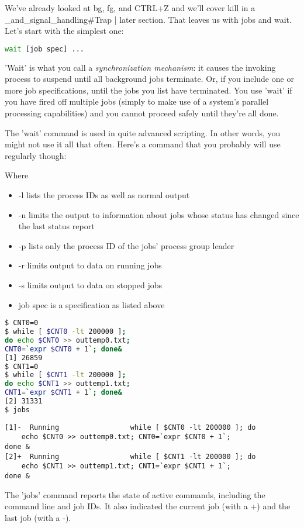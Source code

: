 We've already looked at bg, fg, and CTRL+Z and we'll cover kill in a
\_and\_signal\_handling\#Trap | later section. That leaves us with jobs and
wait. Let's start with the simplest one:

\lstset{basicstyle=\scriptsize, numbers=left, captionpos=b, tabsize=4}
\begin{lstlisting}[caption=job wait,language={bash},
xleftmargin=15pt,label=lst:jobwait]
wait [job spec] ...
\end{lstlisting}

'Wait' is what you call a \textit{synchronization mechanism}: it causes the
invoking process to suspend until all background jobs terminate. Or, if you
include one or more job specifications, until the jobs you list have
terminated. You use 'wait' if you have fired off multiple jobs (simply to make
use of a system's parallel processing capabilities) and you cannot proceed
safely until they're all done.

The 'wait' command is used in quite advanced scripting. In other words, you
might not use it all that often. Here's a command that you probably will use
regularly though:

Where 
\begin{itemize}
\item -l lists the process IDs as well as normal output
\item -n limits the output to information about jobs whose status has changed since the last status report
\item -p lists only the process ID of the jobs' process group leader
\item -r limits output to data on running jobs
\item -s limits output to data on stopped jobs
\item job spec is a specification as listed above
\end{itemize}

\lstset{basicstyle=\scriptsize, numbers=left, captionpos=b, tabsize=4}
\begin{lstlisting}[caption=another wait,language={bash},
xleftmargin=15pt,label=lst:anotherwait]
$ CNT0=0
$ while [ $CNT0 -lt 200000 ];
do echo $CNT0 >> outtemp0.txt;
CNT0=`expr $CNT0 + 1`; done&
[1] 26859
$ CNT1=0
$ while [ $CNT1 -lt 200000 ];
do echo $CNT1 >> outtemp1.txt; 
CNT1=`expr $CNT1 + 1`; done&
[2] 31331
$ jobs
\end{lstlisting}

\scriptsize
\begin{verbatim}
[1]-  Running                 while [ $CNT0 -lt 200000 ]; do
    echo $CNT0 >> outtemp0.txt; CNT0=`expr $CNT0 + 1`;
done &
[2]+  Running                 while [ $CNT1 -lt 200000 ]; do
    echo $CNT1 >> outtemp1.txt; CNT1=`expr $CNT1 + 1`;
done &
\end{verbatim}
\normalsize
The 'jobs' command reports the state of active commands, including the command
line and job IDs. It also indicated the current job (with a +) and the last job
(with a -).

